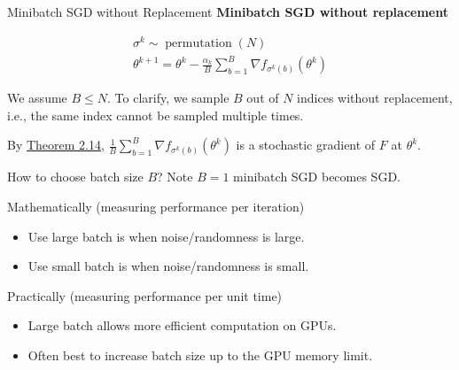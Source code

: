 \begin{frame}[allowframebreaks]

\begin{mydefinitionblock}{2.15}{Minibatch SGD without Replacement}
    \textbf{Minibatch SGD without replacement}

    $$
    \begin{gathered}
    \sigma^{k} \sim \operatorname{permutation}(N) \\
    \theta^{k+1}=\theta^{k}-\frac{\alpha_{k}}{B} \sum_{b=1}^{B} \nabla f_{\sigma^{k}(b)}\left(\theta^{k}\right)
    \end{gathered}
    $$

    We assume $B \leq N$. To clarify, we sample $B$ out of $N$ indices without replacement, i.e., the same index cannot be sampled multiple times.

    By \hyperref[theorem:2.14]{Theorem 2.14}, $\frac{1}{B} \sum_{b=1}^{B} \nabla f_{\sigma^{k}(b)}\left(\theta^{k}\right)$ is a stochastic gradient of $F$ at $\theta^{k}$.
\end{mydefinitionblock}

\end{frame}

\begin{frame}[allowframebreaks]

\begin{myconceptblock}{2.16}{How to choose batch size $B$?}
    Note $B=1$ minibatch SGD becomes SGD.

    Mathematically (measuring performance per iteration)

    \begin{itemize}
        \item Use large batch is when noise/randomness is large.
        \item Use small batch is when noise/randomness is small.
    \end{itemize}

    Practically (measuring performance per unit time)

    \begin{itemize}
        \item Large batch allows more efficient computation on GPUs.
        \item Often best to increase batch size up to the GPU memory limit.
    \end{itemize}
\end{myconceptblock}

\end{frame}


